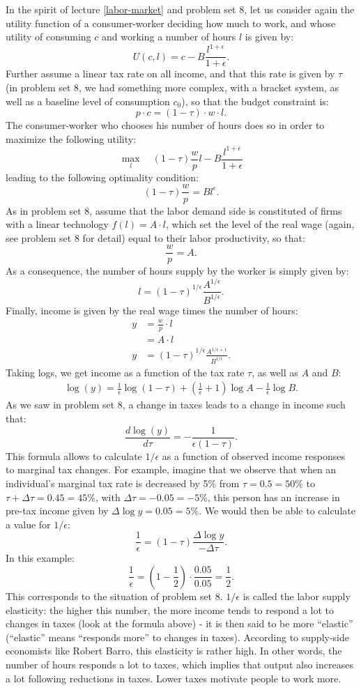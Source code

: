 \documentclass[]{book}
\begin{document}
In the spirit of lecture \ref{labor-market} and problem set 8, let us
consider again the utility function of a consumer-worker deciding how
much to work, and whose utility of consuming \(c\) and working a number
of hours \(l\) is given by:
\[U(c, l)=c-B\frac{l^{1+\epsilon}}{1+\epsilon}.\] Further assume a
linear tax rate on all income, and that this rate is given by \(\tau\)
(in problem set 8, we had something more complex, with a bracket system,
as well as a baseline level of consumption \(c_0\)), so that the budget
constraint is: \[p \cdot c = (1-\tau)\cdot w \cdot l.\] The
consumer-worker who chooses his number of hours does so in order to
maximize the following utility:
\[\max_l \quad (1-\tau)\frac{w}{p}l -B\frac{l^{1+\epsilon}}{1+\epsilon}\]
leading to the following optimality condition:
\[(1-\tau)\frac{w}{p}=B l^{\epsilon}.\] As in problem set 8, assume that
the labor demand side is constituted of firms with a linear technology
\(f(l) = A \cdot l\), which set the level of the real wage (again, see
problem set 8 for detail) equal to their labor productivity, so that:
\[\frac{w}{p}=A.\] As a consequence, the number of hours supply by the
worker is simply given by:
\[l=(1-\tau)^{1/\epsilon}\frac{A^{1/\epsilon}}{B^{1/\epsilon}}.\]
Finally, income is given by the real wage times the number of hours: \[
\begin{aligned}
y &= \frac{w}{p} \cdot l \\ 
&= A \cdot l \\
y &= (1-\tau)^{1/\epsilon}\frac{A^{1/\epsilon+1}}{B^{1/\epsilon}}.
\end{aligned}
\] Taking logs, we get income as a function of the tax rate \(\tau\), as
well as \(A\) and \(B\): \[
\begin{aligned}
\log(y) = \frac{1}{\epsilon}\log(1-\tau)+\left(\frac{1}{\epsilon}+1\right)\log A-\frac{1}{\epsilon}\log B.
\end{aligned}
\] As we saw in problem set 8, a change in taxes leads to a change in
income such that:
\[\frac{d \log(y)}{d \tau}=-\frac{1}{\epsilon (1-\tau)}.\] This formula
allows to calculate \(1/\epsilon\) as a function of observed income
responses to marginal tax changes. For example, imagine that we observe
that when an individual's marginal tax rate is decreased by 5\% from
\(\tau = 0.5 = 50\%\) to \(\tau+\Delta \tau = 0.45 = 45\%\), with
\(\Delta \tau = -0.05 = -5\%\), this person has an increase in pre-tax
income given by \(\Delta \log y = 0.05 = 5\%\). We would then be able to
calculate a value for \(1/\epsilon\):
\[\frac{1}{\epsilon}=(1-\tau)\frac{\Delta \log y}{-\Delta \tau}.\] In
this example:
\[\frac{1}{\epsilon} = \left(1-\frac{1}{2}\right) \cdot \frac{0.05}{0.05} = \frac{1}{2}.\]
This corresponds to the situation of problem set 8. \(1/\epsilon\) is
called the labor supply elasticity: the higher this number, the more
income tends to respond a lot to changes in taxes (look at the formula
above) - it is then said to be more ``elastic'' (``elastic'' means
``responds more'' to changes in taxes). According to supply-side
economists like Robert Barro, this elasticity is rather high. In other
words, the number of hours responds a lot to taxes, which implies that
output also increases a lot following reductions in taxes. Lower taxes
motivate people to work more.
\end{document}
